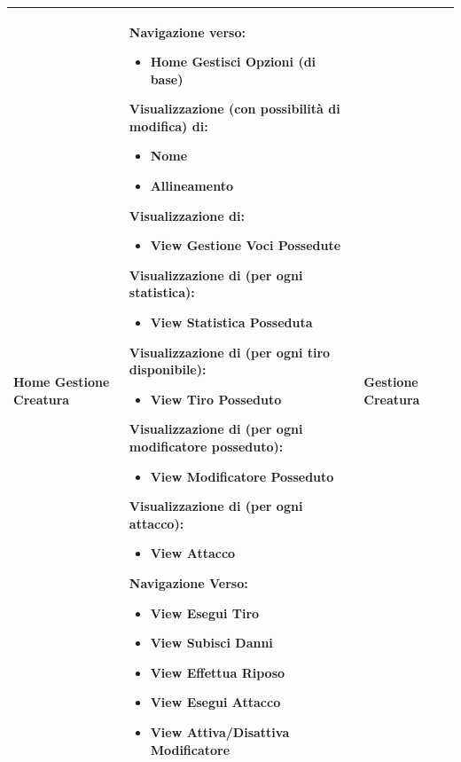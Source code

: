 \documentclass[a4paper, 11pt]{article}
\begin{document}
\begin{adjustwidth}{-1.5cm}{-1.5cm}
\begin{center}
\begin{longtable}{|p{5cm}|p{5cm}|p{5cm}|}
        Home Gestione Creatura & Navigazione verso:
        \begin{itemize}
            \item Home Gestisci Opzioni (di base)
        \end{itemize}
        Visualizzazione (con possibilità di modifica) di:
        \begin{itemize}
            \item Nome
            \item Allineamento
        \end{itemize}
        Visualizzazione di:
        \begin{itemize}
            \item View Gestione Voci Possedute
        \end{itemize}
        Visualizzazione di (per ogni statistica):
        \begin{itemize}
            \item View Statistica Posseduta
        \end{itemize}
        Visualizzazione di (per ogni tiro disponibile):
        \begin{itemize}
            \item View Tiro Posseduto
        \end{itemize}
        Visualizzazione di (per ogni modificatore posseduto):
        \begin{itemize}
            \item View Modificatore Posseduto
        \end{itemize}
        Visualizzazione di (per ogni attacco):
        \begin{itemize}
            \item View Attacco
        \end{itemize}
        Navigazione Verso: 
        \begin{itemize}
            \item View Esegui Tiro
            \item View Subisci Danni
            \item View Effettua Riposo
            \item View Esegui Attacco
            \item View Attiva/Disattiva Modificatore
        \end{itemize} & Gestione Creatura \\ \hline
        

\end{longtable}
\end{center}
\end{adjustwidth}
\end{document}
